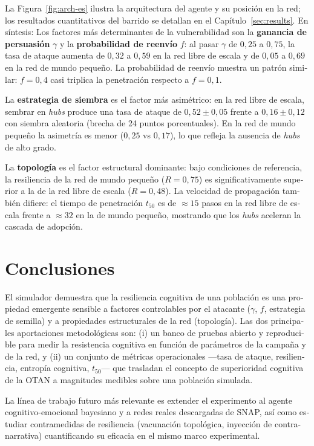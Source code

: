 \documentclass[12pt]{extarticle}
\numberwithin{equation}{section}
\newcommand{\sectionnotoc}[1]{%
    \refstepcounter{section}%
    \section*{\thesection\quad #1}%
}
\begin{document}
\begin{otherlanguage}{spanish}
La Figura~\ref{fig:arch-es} ilustra la arquitectura del agente y su posición en la red; los resultados cuantitativos del barrido se detallan en el Capítulo~\ref{sec:results}. En síntesis: Los factores más determinantes de la vulnerabilidad son la \textbf{ganancia de persuasión} $\gamma$ y la \textbf{probabilidad de reenvío} $f$: al pasar $\gamma$ de $0{,}25$ a $0{,}75$, la tasa de ataque aumenta de $0{,}32$ a $0{,}59$ en la red libre de escala y de $0{,}05$ a $0{,}69$ en la red de mundo pequeño. La probabilidad de reenvío muestra un patrón similar: $f = 0{,}4$ casi triplica la penetración respecto a $f = 0{,}1$.

La \textbf{estrategia de siembra} es el factor más asimétrico: en la red libre de escala, sembrar en \emph{hubs} produce una tasa de ataque de $0{,}52 \pm 0{,}05$ frente a $0{,}16 \pm 0{,}12$ con siembra aleatoria (brecha de 24 puntos porcentuales). En la red de mundo pequeño la asimetría es menor ($0{,}25$ vs $0{,}17$), lo que refleja la ausencia de \emph{hubs} de alto grado.

La \textbf{topología} es el factor estructural dominante: bajo condiciones de referencia, la resiliencia de la red de mundo pequeño ($R = 0{,}75$) es significativamente superior a la de la red libre de escala ($R = 0{,}48$). La velocidad de propagación también difiere: el tiempo de penetración $t_{50}$ es de $\approx 15$ pasos en la red libre de escala frente a $\approx 32$ en la de mundo pequeño, mostrando que los \emph{hubs} aceleran la cascada de adopción.

\sectionnotoc{Conclusiones}

El simulador demuestra que la resiliencia cognitiva de una población es una propiedad emergente sensible a factores controlables por el atacante ($\gamma$, $f$, estrategia de semilla) y a propiedades estructurales de la red (topología). Las dos principales aportaciones metodológicas son: (i) un banco de pruebas abierto y reproducible para medir la resistencia cognitiva en función de parámetros de la campaña y de la red, y (ii) un conjunto de métricas operacionales ---tasa de ataque, resiliencia, entropía cognitiva, $t_{50}$--- que trasladan el concepto de superioridad cognitiva de la OTAN a magnitudes medibles sobre una población simulada.

La línea de trabajo futuro más relevante es extender el experimento al agente cognitivo-emocional bayesiano y a redes reales descargadas de SNAP, así como estudiar contramedidas de resiliencia (vacunación topológica, inyección de contra-narrativa) cuantificando su eficacia en el mismo marco experimental.

\end{otherlanguage}
\end{document}
